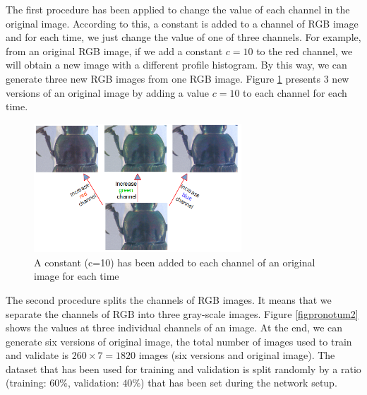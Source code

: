 \documentclass{article} %
\begin{document}
\begin{multicols}{2}

The first procedure has been applied to change the value of each channel in the original image. According to this, a constant is added to a channel of RGB image and for each time, we just change the value of one of three channels. For example, from an original RGB image, if we add a constant $c = 10$ to the red channel, we will obtain a new image with a different profile histogram. By this way, we can generate three new RGB images from one RGB image. Figure \ref{figpronotum} presents $3$ new versions of an original image by adding a value $c = 10$ to each channel for each time.

\begin{figure}[H]
	\centerline{\includegraphics[height=1.9in]{images/inc_channels.png}}
	\caption{\footnotesize{A constant (c=10) has been added to each channel of an original image for each time}}
	\label{figpronotum}
\end{figure}

The second procedure splits the channels of RGB images. It means that we separate the channels of RGB into three gray-scale images. Figure \ref{figpronotum2} shows the values at three individual channels of an image. At the end, we can generate six versions of original image, the total number of images used to train and validate is $260 \times 7 = 1820$ images (six versions and original image). The dataset that has been used for training and validation is split randomly by a ratio (training: $60\%$, validation: $40\%$) that has been set during the network setup.


\end{multicols}
\end{document}
